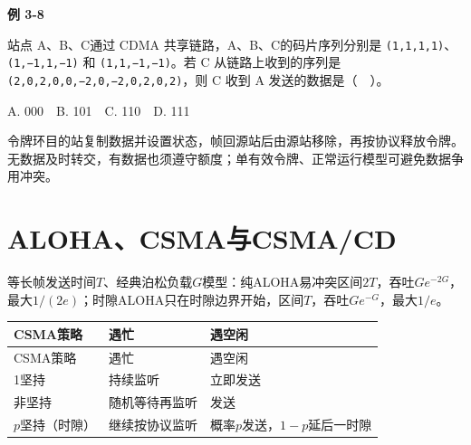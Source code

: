 \par\medskip{}\noindent\hypertarget{CN03-E07}{}\label{CN03-E07}\textbf{例 3-8}\par\nobreak\smallskip

站点 A、B、C通过 CDMA 共享链路，A、B、C的码片序列分别是 \texttt{(\allowbreak{}1,\allowbreak{}1,\allowbreak{}1,\allowbreak{}1)\allowbreak{}}、\texttt{(\allowbreak{}1,\allowbreak{}−1,\allowbreak{}1,\allowbreak{}−1)\allowbreak{}} 和 \texttt{(\allowbreak{}1,\allowbreak{}1,\allowbreak{}−1,\allowbreak{}−1)\allowbreak{}}。若 C 从链路上收到的序列是 \texttt{(\allowbreak{}2,\allowbreak{}0,\allowbreak{}2,\allowbreak{}0,\allowbreak{}0,\allowbreak{}−2,\allowbreak{}0,\allowbreak{}−2,\allowbreak{}0,\allowbreak{}2,\allowbreak{}0,\allowbreak{}2)\allowbreak{}}，则 C 收到 A 发送的数据是（　）。

A. 000　B. 101　C. 110　D. 111

令牌环目的站复制数据并设置状态，帧回源站后由源站移除，再按协议释放令牌。无数据及时转交，有数据也须遵守额度；单有效令牌、正常运行模型可避免数据争用冲突。

\section{ALOHA、CSMA与CSMA/CD}\label{CN03-csma}

等长帧发送时间\(T\)、经典泊松负载\(G\)模型：纯ALOHA易冲突区间\(2T\)，吞吐\(Ge^{-2G}\)，最大\(1/(2e)\)；时隙ALOHA只在时隙边界开始，区间\(T\)，吞吐\(Ge^{-G}\)，最大\(1/e\)。

\par\smallskip
{\fontsize{9.3}{12}\selectfont\setlength{\tabcolsep}{2.5pt}\setlength{\LTleft}{0pt}\setlength{\LTright}{0pt}
\begin{longtable}{@{}>{\raggedright\arraybackslash}p{}>{\raggedright\arraybackslash}p{}>{\raggedright\arraybackslash}p{}@{}}
\toprule
CSMA策略 & 遇忙 & 遇空闲 \\

\midrule\endfirsthead\toprule
CSMA策略 & 遇忙 & 遇空闲 \\

\midrule\endhead\bottomrule\endfoot
1坚持 & 持续监听 & 立即发送 \\

非坚持 & 随机等待再监听 & 发送 \\

\(p\)坚持（时隙） & 继续按协议监听 & 概率\(p\)发送，\(1-p\)延后一时隙 \\

\end{longtable}}
\par\smallskip

